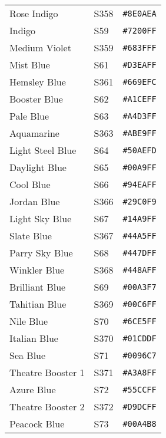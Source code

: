 \documentclass[a4paper]{article}
\begin{document}
\begin{longtable}{|l|l|r|}
Rose Indigo & S358 & \texttt{\#8E0AEA} \cellcolor[HTML]{8E0AEA} \\
Indigo & S59 & \texttt{\#7200FF} \cellcolor[HTML]{7200FF} \\
Medium Violet & S359 & \texttt{\#683FFF} \cellcolor[HTML]{683FFF} \\
Mist Blue & S61 & \texttt{\#D3EAFF} \cellcolor[HTML]{D3EAFF} \\
Hemsley Blue & S361 & \texttt{\#669EFC} \cellcolor[HTML]{669EFC} \\
Booster Blue & S62 & \texttt{\#A1CEFF} \cellcolor[HTML]{A1CEFF} \\
Pale Blue & S63 & \texttt{\#A4D3FF} \cellcolor[HTML]{A4D3FF} \\
Aquamarine & S363 & \texttt{\#ABE9FF} \cellcolor[HTML]{ABE9FF} \\
Light Steel Blue & S64 & \texttt{\#50AEFD} \cellcolor[HTML]{50AEFD} \\
Daylight Blue & S65 & \texttt{\#00A9FF} \cellcolor[HTML]{00A9FF} \\
Cool Blue & S66 & \texttt{\#94EAFF} \cellcolor[HTML]{94EAFF} \\
Jordan Blue & S366 & \texttt{\#29C0F9} \cellcolor[HTML]{29C0F9} \\
Light Sky Blue & S67 & \texttt{\#14A9FF} \cellcolor[HTML]{14A9FF} \\
Slate Blue & S367 & \texttt{\#44A5FF} \cellcolor[HTML]{44A5FF} \\
Parry Sky Blue & S68 & \texttt{\#447DFF} \cellcolor[HTML]{447DFF} \\
Winkler Blue & S368 & \texttt{\#448AFF} \cellcolor[HTML]{448AFF} \\
Brilliant Blue & S69 & \texttt{\#00A3F7} \cellcolor[HTML]{00A3F7} \\
Tahitian Blue & S369 & \texttt{\#00C6FF} \cellcolor[HTML]{00C6FF} \\
Nile Blue & S70 & \texttt{\#6CE5FF} \cellcolor[HTML]{6CE5FF} \\
Italian Blue & S370 & \texttt{\#01CDDF} \cellcolor[HTML]{01CDDF} \\
Sea Blue & S71 & \texttt{\#0096C7} \cellcolor[HTML]{0096C7} \\
Theatre Booster 1 & S371 & \texttt{\#A3A8FF} \cellcolor[HTML]{A3A8FF} \\
Azure Blue & S72 & \texttt{\#55CCFF} \cellcolor[HTML]{55CCFF} \\
Theatre Booster 2 & S372 & \texttt{\#D9DCFF} \cellcolor[HTML]{D9DCFF} \\
Peacock Blue & S73 & \texttt{\#00A4B8} \cellcolor[HTML]{00A4B8} \\

\end{longtable}
\end{document}
